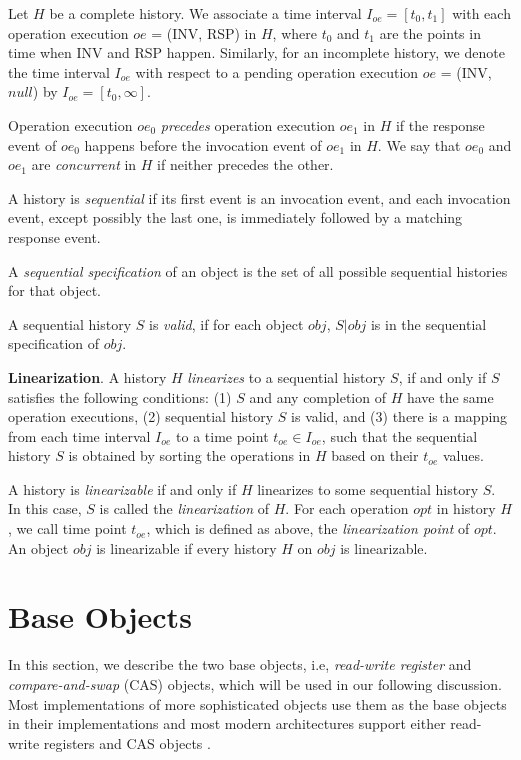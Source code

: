Let $H$ be a complete history. We associate a time interval $I_{oe} = [t_0, t_1]$ with each
operation execution $oe$ = (INV, RSP) in $H$, where $t_0$ and $t_1$ are the points in time when INV and RSP happen.
Similarly, for an incomplete history, we denote the time interval $I_{oe}$ with respect to a pending
operation execution $oe$ = (INV, $null$) by $I_{oe} = [t_0, \infty]$.

Operation execution $oe_0$ \emph{precedes} operation execution $oe_1$ in $H$ if the response event of
$oe_0$ happens before the invocation event of $oe_1$ in $H$.
We say that $oe_0$ and $oe_1$ are \emph{concurrent} in $H$ if neither precedes the other.

A history is \emph{sequential} if its first event is an invocation event, and each invocation event, except
possibly the last one, is immediately followed by a matching response event.

A \emph{sequential specification} of an object is the set of all possible sequential histories
for that object.

A sequential history $S$ is \emph{valid}, if for each object $obj$, $S|obj$ is
in the sequential specification of $obj$.

\textbf{Linearization}.
A history $H$ \emph{linearizes} to a sequential history $S$, if and only if $S$ satisfies the
following conditions: (1) $S$ and any completion of $H$ have the same operation executions, (2) sequential history $S$ is
valid, and (3) there is a mapping from each time interval $I_{oe}$ to a time point $t_{oe} \in I_{oe}$, such
that the sequential history $S$ is obtained by sorting the operations in $H$ based on their $t_{oe}$ values.

A history is \emph{linearizable} if and only if $H$ linearizes to some sequential history $S$. In this case,
$S$ is called the \emph{linearization} of $H$. For each operation $opt$ in history $H$, we call time point $t_{oe}$, which is
defined as above, the \emph{linearization point} of $opt$. An object $obj$ is linearizable if every
history $H$ on $obj$ is linearizable.

\section{Base Objects}
In this section, we describe the two base objects, i.e, \emph{read-write register} and \emph{compare-and-swap} (CAS)
objects, which will be used in our following discussion. Most implementations
of more sophisticated objects use them as the base objects in their implementations and
most modern architectures support either read-write registers and CAS objects \cite{itanium} \cite{weaver1994sparc}.

